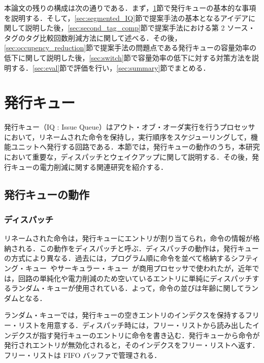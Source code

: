 \documentclass[submit,techrep,noauthor]{ipsj}
\begin{document}
本論文の残りの構成は次の通りである．まず，\ref{sec:issue_queue}節で発行キューの基本的な事項を説明する．そして，\ref{sec:segmented_IQ}節で提案手法の基本となるアイデアに関して説明した後，\ref{sec:second_tag_comp}節で提案手法における第 2  ソース・タグのタグ比較回数削減方法に関して述べる．その後，\ref{sec:occupency_reduction}節で提案手法の問題点である発行キューの容量効率の低下に関して説明した後，\ref{sec:switch}節で容量効率の低下に対する対策方法を説明する．\ref{sec:eval}節で評価を行い，\ref{sec:summary}節でまとめる．

\section{発行キュー}
\label{sec:issue_queue}
発行キュー（IQ : Issue Queue）はアウト・オブ・オーダ実行を行うプロセッサにおいて，リネームされた命令を保持し，実行順序をスケジューリングして，機能ユニットへ発行する回路である．本節では，発行キューの動作のうち，本研究において重要な，ディスパッチとウェイクアップに関して説明する．その後，発行キューの電力削減に関する関連研究を紹介する．

\subsection{発行キューの動作}
\subsubsection{ディスパッチ}
リネームされた命令は，発行キューにエントリが割り当てられ，命令の情報が格納される．この動作をディスパッチと呼ぶ．ディスパッチの動作は，発行キューの方式により異なる．過去には，プログラム順に命令を並べて格納するシフティング・キュー~\cite{Farrell1998}やサーキュラー・キュー~\cite{Abella:survey2003}が商用プロセッサで使われたが，近年では，回路の単純化や電力削減のため空いているエントリに単純にディスパッチするランダム・キューが使用されている．よって，命令の並びは年齢に関してランダムとなる．

ランダム・キューでは，発行キューの空きエントリのインデクスを保持するフリー・リストを用意する．ディスパッチ時には，フリー・リストから読み出したインデクスが指す発行キューのエントリに命令を書き込む．発行キューから命令が発行されエントリが無効化されると，そのインデクスをフリー・リストへ返す．フリー・リストは FIFO バッファで管理される．
\end{document}
